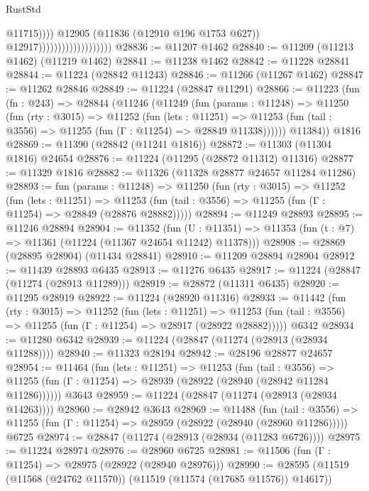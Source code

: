 \begin{lexlean}{RustStd}
\begin{coremodule}
                                                  @11715))))
                                          @12905
                                          (@11836 (@12910 @196 @1753 @627))
                                          @12917)))))))))))))))))))
@28836 := @11207 @1462
@28840 := @11209 (@11213 @1462) (@11219 @1462)
@28841 := @11238 @1462
@28842 := @11228 @28841
@28844 := @11224 (@28842 @11243)
@28846 := @11266 (@11267 @1462)
@28847 := @11262 @28846
@28849 := @11224 (@28847 @11291)
@28866 := @11223
    (fun (fn : @243) =>
    @28844
      (@11246
        (@11249
          (fun (params : @11248) =>
          @11250
            (fun (rty : @3015) =>
            @11252
              (fun (lets : @11251) =>
              @11253 (fun (tail : @3556) => @11255 (fun (Γ : @11254) => @28849 @11338))))))
        @11384))
    @1816
@28869 := @11390 (@28842 (@11241 @1816))
@28872 := @11303 (@11304 @1816) @24654
@28876 := @11224 (@11295 (@28872 @11312) @11316)
@28877 := @11329 @1816
@28882 := @11326 (@11328 @28877 @24657 @11284 @11286)
@28893 := fun (params : @11248) =>
  @11250
    (fun (rty : @3015) =>
    @11252
      (fun (lets : @11251) =>
      @11253 (fun (tail : @3556) => @11255 (fun (Γ : @11254) => @28849 (@28876 @28882)))))
@28894 := @11249 @28893
@28895 := @11246 @28894
@28904 := @11352
    (fun (U : @11351) => @11353 (fun (t : @7) => @11361 (@11224 (@11367 @24654 @11242) @11378)))
@28908 := @28869 (@28895 @28904) (@11434 @28841)
@28910 := @11209 @28894 @28904
@28912 := @11439 @28893 @6435
@28913 := @11276 @6435
@28917 := @11224 (@28847 (@11274 (@28913 @11289)))
@28919 := @28872 (@11311 @6435)
@28920 := @11295 @28919
@28922 := @11224 (@28920 @11316)
@28933 := @11442
    (fun (rty : @3015) =>
    @11252
      (fun (lets : @11251) =>
      @11253 (fun (tail : @3556) => @11255 (fun (Γ : @11254) => @28917 (@28922 @28882)))))
    @6342
@28934 := @11280 @6342
@28939 := @11224 (@28847 (@11274 (@28913 (@28934 @11288))))
@28940 := @11323 @28194
@28942 := @28196 @28877 @24657
@28954 := @11464
    (fun (lets : @11251) =>
    @11253
      (fun (tail : @3556) =>
      @11255 (fun (Γ : @11254) => @28939 (@28922 (@28940 (@28942 @11284 @11286))))))
    @3643
@28959 := @11224 (@28847 (@11274 (@28913 (@28934 @14263))))
@28960 := @28942 @3643
@28969 := @11488
    (fun (tail : @3556) => @11255 (fun (Γ : @11254) => @28959 (@28922 (@28940 (@28960 @11286)))))
    @6725
@28974 := @28847 (@11274 (@28913 (@28934 (@11283 @6726))))
@28975 := @11224 @28974
@28976 := @28960 @6725
@28981 := @11506 (fun (Γ : @11254) => @28975 (@28922 (@28940 @28976)))
@28990 := @28595 (@11519 (@11568 (@24762 @11570)) (@11519 (@11574 (@17685 @11576)) @14617))

\end{coremodule}
\end{lexlean}
